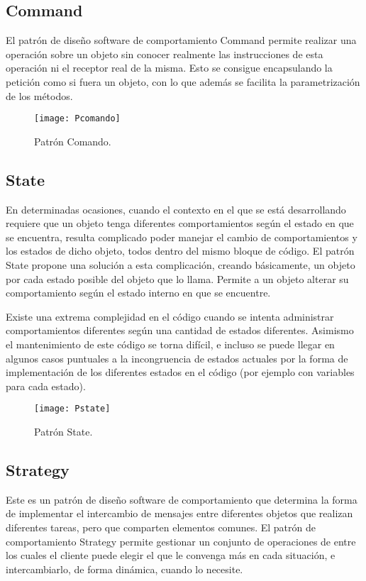 \subsection{Command}

El patrón de diseño software de comportamiento Command permite realizar una operación sobre un objeto sin conocer realmente las instrucciones de esta operación ni el receptor real de la misma. Esto se consigue encapsulando la petición como si fuera un objeto, con lo que además se facilita la parametrización de los métodos.

\begin{figure}[H]
\centering
\texttt{[image: Pcomando]}
\caption{Patrón Comando.}
\end{figure}

\subsection{State}

En determinadas ocasiones, cuando el contexto en el que se está desarrollando requiere que un objeto tenga diferentes comportamientos según el estado en que se encuentra, resulta complicado poder manejar el cambio de comportamientos y los estados de dicho objeto, todos dentro del mismo bloque de código. El patrón State propone una solución a esta complicación, creando básicamente, un objeto por cada estado posible del objeto que lo llama. Permite a un objeto alterar su comportamiento según el estado interno en que se encuentre.

Existe una extrema complejidad en el código cuando se intenta administrar comportamientos diferentes según una cantidad de estados diferentes. Asimismo el mantenimiento de este código se torna difícil, e incluso se puede llegar en algunos casos puntuales a la incongruencia de estados actuales por la forma de implementación de los diferentes estados en el código (por ejemplo con variables para cada estado).

\begin{figure}[H]
\centering
\texttt{[image: Pstate]}
\caption{Patrón State.}
\end{figure}

\subsection{Strategy}

Este es un patrón de diseño software de comportamiento que determina la forma de implementar el intercambio de mensajes entre diferentes objetos que realizan diferentes tareas, pero que comparten elementos comunes. El patrón de comportamiento Strategy permite gestionar un conjunto de operaciones de entre los cuales el cliente puede elegir el que le convenga más en cada situación, e intercambiarlo, de forma dinámica, cuando lo necesite.

